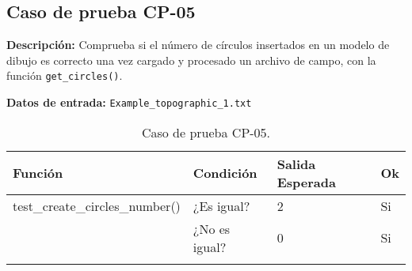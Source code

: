 \subsection{Caso de prueba CP-05}

\textbf{Descripción:} Comprueba si el número de círculos insertados en un modelo de dibujo es correcto una vez cargado y procesado un archivo de campo, con la función \texttt{get\_circles()}.

\textbf{Datos de entrada:} \texttt{Example\_topographic\_1.txt}


\begin{longtable}[]{@{}llll@{}}
\toprule
\begin{minipage}[b]{0.6\columnwidth}\raggedright\strut
Función\strut
\end{minipage} & \begin{minipage}[b]{0.20\columnwidth}\raggedright\strut
Condición\strut
\end{minipage} & \begin{minipage}[b]{0.15\columnwidth}\raggedright\strut
Salida Esperada\strut
\end{minipage} & \begin{minipage}[b]{0.05\columnwidth}\raggedright\strut
Ok\strut
\end{minipage}\tabularnewline
\midrule
\endhead
\begin{minipage}[t]{0.6\columnwidth}\raggedright\strut
test\_create\_circles\_number()\strut
\end{minipage} & \begin{minipage}[t]{0.20\columnwidth}\raggedright\strut
¿Es igual?\strut
\end{minipage} & \begin{minipage}[t]{0.15\columnwidth}\raggedright\strut
2\strut
\end{minipage} & \begin{minipage}[t]{0.05\columnwidth}\raggedright\strut
Si\strut
\end{minipage}\tabularnewline
\begin{minipage}[t]{0.6\columnwidth}\raggedright\strut
\strut
\end{minipage} & \begin{minipage}[t]{0.20\columnwidth}\raggedright\strut
¿No es igual?\strut
\end{minipage} & \begin{minipage}[t]{0.15\columnwidth}\raggedright\strut
0\strut
\end{minipage} & \begin{minipage}[t]{0.05\columnwidth}\raggedright\strut
Si\strut
\end{minipage}\tabularnewline

\bottomrule
\caption{Caso de prueba CP-05.}
\end{longtable}

